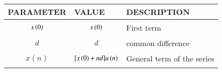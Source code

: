 \begin{tabular}{|p{2cm}|p{2.5cm}|p{2.3cm}|}
    \hline
    PARAMETER & VALUE & DESCRIPTION  \\ \hline
    $$x\left(0\right)$$ & $$x\left(0\right)$$ & First term \\ \hline
    $$d$$ & $$d$$ & common difference \\ \hline
    $$x(n)$$ & $$[x\left(0\right)+nd]u\left(n\right)$$ & General term of the series  \\ \hline
  \end{tabular}
